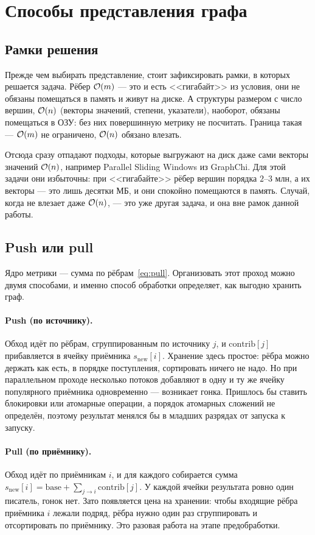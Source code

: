 \section{Способы представления графа}
\label{sec:approaches}

\subsection{Рамки решения}
\label{sec:scope}
Прежде чем выбирать представление, стоит зафиксировать рамки, в которых решается задача. Рёбер
$\mathcal{O}(m)$ --- это и есть <<гигабайт>> из условия, они не обязаны помещаться в память и живут на
диске. А структуры размером с число вершин, $\mathcal{O}(n)$ (векторы значений, степени, указатели),
наоборот, обязаны помещаться в ОЗУ: без них повершинную метрику не посчитать. Граница такая ---
$\mathcal{O}(m)$ не ограничено, $\mathcal{O}(n)$ обязано влезать.

Отсюда сразу отпадают подходы, которые выгружают на диск даже сами векторы значений $\mathcal{O}(n)$,
например Parallel Sliding Windows из GraphChi. Для этой задачи они избыточны: при <<гигабайте>> рёбер
вершин порядка $2$--$3$ млн, а их векторы --- это лишь десятки МБ, и они спокойно помещаются в память.
Случай, когда не влезает даже $\mathcal{O}(n)$, --- это уже другая задача, и она вне рамок данной работы.

\subsection{Push или pull}
Ядро метрики --- сумма по рёбрам~\eqref{eq:pull}. Организовать этот проход можно двумя способами, и
именно способ обработки определяет, как выгодно хранить граф.

\paragraph{Push (по источнику).} Обход идёт по рёбрам, сгруппированным по источнику $j$, и
$\mathrm{contrib}[j]$ прибавляется в ячейку приёмника $s_{\mathrm{new}}[i]$. Хранение здесь простое:
рёбра можно держать как есть, в порядке поступления, сортировать ничего не надо. Но при параллельном
проходе несколько потоков добавляют в одну и ту же ячейку популярного приёмника одновременно ---
возникает гонка. Пришлось бы ставить блокировки или атомарные операции, а порядок атомарных сложений
не определён, поэтому результат менялся бы в младших разрядах от запуска к запуску.

\paragraph{Pull (по приёмнику).} Обход идёт по приёмникам $i$, и для каждого собирается сумма
$s_{\mathrm{new}}[i] = \mathrm{base} + \sum_{j\to i}\mathrm{contrib}[j]$. У каждой ячейки результата
ровно один писатель, гонок нет. Зато появляется цена на хранении: чтобы входящие рёбра приёмника $i$
лежали подряд, рёбра нужно один раз сгруппировать и отсортировать по приёмнику. Это разовая работа на
этапе предобработки.

